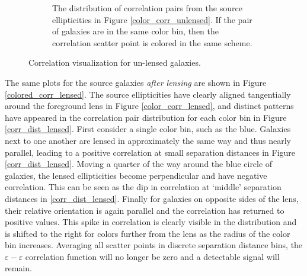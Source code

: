 \documentclass[%
 reprint,
 amsmath,amssymb,
 aps,nofootinbib
]{revtex4-1}
\begin{document}
\begin{figure}
\begin{subfigure}{0.45\textwidth}
        \captionsetup{justification=raggedright,singlelinecheck=false}
        \caption{The distribution of correlation pairs from the source ellipticities in Figure \ref{color_corr_unlensed}. If the pair of galaxies are in the same color bin, then the correlation scatter point is colored in the same scheme.}
        \label{corr_dist_unlensed}
    \end{subfigure}
    \caption{Correlation visualization for un-lensed galaxies.}
    \label{colored_corr}
\end{figure}

The same plots for the source galaxies \textit{after lensing} are shown in Figure \ref{colored_corr_lensed}. The source ellipticities have clearly aligned tangentially around the foreground lens in Figure \ref{color_corr_lensed}, and distinct patterns have appeared in the correlation pair distribution for each color bin in Figure \ref{corr_dist_lensed}. First consider a single color bin, such as the blue. Galaxies next to one another are lensed in approximately the same way and thus nearly parallel, leading to a positive correlation at small separation distances in Figure \ref{corr_dist_lensed}. Moving a quarter of the way around the blue circle of galaxies, the lensed ellipticities become perpendicular and have negative correlation. This can be seen as the dip in correlation at `middle' separation distances in \ref{corr_dist_lensed}. Finally for galaxies on opposite sides of the lens, their relative orientation is again parallel and the correlation has returned to positive values. This spike in correlation is clearly visible in the distribution and is shifted to the right for colors further from the lens as the radius of the color bin increases. Averaging all scatter points in discrete separation distance bins, the $\varepsilon-\varepsilon$ correlation function will no longer be zero and a detectable signal will remain.
\end{document}
